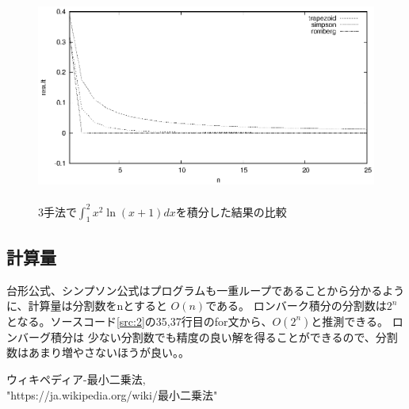 \documentclass[titlepage]{jsarticle}
\begin{document}
		\begin{figure}[]
			\centering
			\includegraphics[height=7cm]{2/res.eps}
			\caption{3手法で$\displaystyle \int^2_1 x^2\ln (x+1)dx$を積分した結果の比較}
			\label{fig:res2}
		\end{figure}


	\subsection{計算量}
		台形公式、シンプソン公式はプログラムも一重ループであることから分かるように、計算量は分割数をnとすると
		$O(n)$である。
		ロンバーク積分の分割数は$2^n$となる。ソースコード\ref{src:2}の35,37行目のfor文から、$O(2^n)$と推測できる。
		ロンバーグ積分は
		少ない分割数でも精度の良い解を得ることができるので、分割数はあまり増やさないほうが良い。。


\begin{thebibliography}{99}
         ウィキペディア-最小二乗法, \\
            "https://ja.wikipedia.org/wiki/最小二乗法"
\end{thebibliography}       
\end{document}
